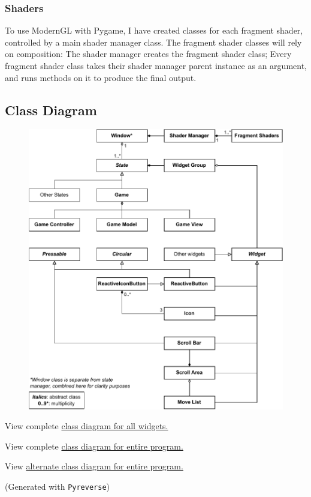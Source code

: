 \documentclass[../main/main.tex]{subfiles}
\begin{document}
\subsubsection*{Shaders}
To use ModernGL with Pygame, I have created classes for each fragment shader, controlled by a main shader manager class. The fragment shader classes will rely on composition: The shader manager creates the fragment shader class; Every fragment shader class takes their shader manager parent instance as an argument, and runs methods on it to produce the final output.

\subsection{Class Diagram}
\begin{figure}[H]
    \centering
    \includegraphics[width=\columnwidth]{../design/assets/class_relation_diagram.pdf}
    \label{fig:class-relation-diagram}
\end{figure}

\noindent View complete \href{https://raw.githubusercontent.com/TubTubTub/NEA/main/documentation/design/assets/documentation/design/assets/widgets_class_diagram.pdf}{class diagram for all widgets.}

\noindent View complete \href{https://raw.githubusercontent.com/TubTubTub/NEA/main/documentation/design/assets/documentation/design/assets/all_class_diagram_1}{class diagram for entire program.}

\noindent View \href{https://raw.githubusercontent.com/TubTubTub/NEA/main/documentation/design/assets/documentation/design/assets/all_class_diagram_2.pdf}{alternate class diagram for entire program.}

\noindent (Generated with \verb|Pyreverse|)
\end{document}
